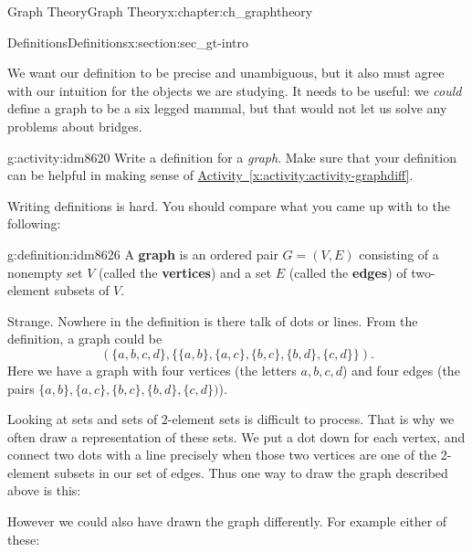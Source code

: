\documentclass[oneside,10pt,]{book}
\newcommand{\terminology}[1]{\textbf{#1}}
\numberwithin{equation}{chapter}
\newcommand{\vtx}[2]{node[fill,circle,inner sep=0pt, minimum size=4pt,label=#1:#2]{}}
\newcommand{\vr}[1]{\vtx{right}{#1}}
\newcommand{\vl}[1]{\vtx{left}{#1}}
\begin{document}
\begin{chapterptx}{Graph Theory}{}{Graph Theory}{}{}{x:chapter:ch_graphtheory}
\begin{sectionptx}{Definitions}{}{Definitions}{}{}{x:section:sec_gt-intro}
\par
We want our definition to be precise and unambiguous, but it also must agree with our intuition for the objects we are studying.  It needs to be useful: we \emph{could} define a graph to be a six legged mammal, but that would not let us solve any problems about bridges.%
\begin{activity}{}{g:activity:idm8620}%
Write a definition for a \emph{graph}.  Make sure that your definition can be helpful in making sense of \hyperref[x:activity:activity-graphdiff]{Activity~\ref{x:activity:activity-graphdiff}}.%
\end{activity}
Writing definitions is hard.  You should compare what you came up with to the following:%
\begin{definition}{}{g:definition:idm8626}%
A \terminology{graph} is an ordered pair \(G = (V, E)\) consisting of a nonempty set \(V\) (called the \terminology{vertices}) and a set \(E\) (called the \terminology{edges}) of two-element subsets of \(V\).%
\end{definition}
Strange.  Nowhere in the definition is there talk of dots or lines.  From the definition, a graph could be%
\begin{equation*}
(\{a,b,c,d\}, \{\{a,b\}, \{a,c\}, \{b,c\}, \{b,d\}, \{c,d\}\}).
\end{equation*}
Here we have a graph with four vertices  (the letters \(a, b, c, d\)) and four edges (the pairs \(\{a,b\}, \{a,c\}, \{b,c\}, \{b,d\}, \{c,d\})\)).%
\par
Looking at sets and sets of 2-element sets is difficult to process.  That is why we often draw a representation of these sets.  We put a dot down for each vertex, and connect two dots with a line precisely when those two vertices are one of the 2-element subsets in our set of edges.  Thus one way to draw the graph described above is this:%
\begin{sidebyside}{1}{0.375}{0.375}{0}%
\begin{sbspanel}{0.25}%
\resizebox{\linewidth}{!}{%
\begin{tikzpicture}[scale=0.7]
   \draw  (-1,1) \vl{\(a\)} -- (1,1) \vr{\(b\)} (-1,1) -- (-1,-1) \vl{\(c\)} -- (1,-1) \vr{\(d\)} -- (1,1) -- (-1,-1);
 \end{tikzpicture}
}%
\end{sbspanel}%
\end{sidebyside}%
\par
However we could also have drawn the graph differently. For example either of these:%
\begin{sidebyside}{2}{0.1375}{0.1375}{0.275}%

\end{sidebyside}
\end{sectionptx}
\end{chapterptx}
\end{document}
